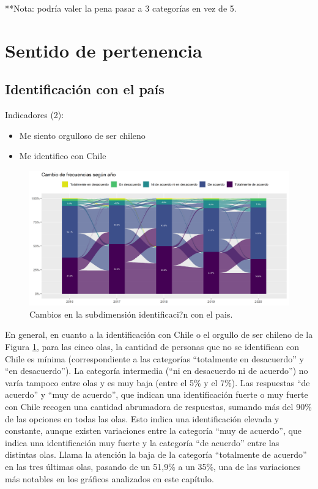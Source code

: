 \documentclass[
  12pt,
]{book}
\begin{document}
**Nota: podría valer la pena pasar a 3 categorías en vez de 5.

\hypertarget{sentido-de-pertenencia-1}{%
\section{Sentido de pertenencia}\label{sentido-de-pertenencia-1}}

\hypertarget{identificaciuxf3n-con-el-pauxeds}{%
\subsection{Identificación con el país}\label{identificaciuxf3n-con-el-pauxeds}}

Indicadores (2):

\begin{itemize}
\item
  Me siento orgulloso de ser chileno
\item
  Me identifico con Chile
\end{itemize}

\begin{figure}[H]

{\centering \includegraphics[width=1\linewidth,height=1\textheight]{output/graphs/alluvial_identificacion} 

}

\caption{Cambios en la subdimensión identificaci?n con el pais.}\label{fig:alluvial-identificacion}
\end{figure}

En general, en cuanto a la identificación con Chile o el orgullo de ser chileno de la Figura \ref{fig:alluvial-identificacion}, para las cinco olas, la cantidad de personas que no se identifican con Chile es mínima (correspondiente a las categorías ``totalmente en desacuerdo'' y ``en desacuerdo''). La categoría intermedia (``ni en desacuerdo ni de acuerdo'') no varía tampoco entre olas y es muy baja (entre el 5\% y el 7\%). Las respuestas ``de acuerdo'' y ``muy de acuerdo'', que indican una identificación fuerte o muy fuerte con Chile recogen una cantidad abrumadora de respuestas, sumando más del 90\% de las opciones en todas las olas. Esto indica una identificación elevada y constante, aunque existen variaciones entre la categoría ``muy de acuerdo'', que indica una identificación muy fuerte y la categoría ``de acuerdo'' entre las distintas olas. Llama la atención la baja de la categoría ``totalmente de acuerdo'' en las tres últimas olas, pasando de un 51,9\% a un 35\%, una de las variaciones más notables en los gráficos analizados en este capítulo.
\end{document}
